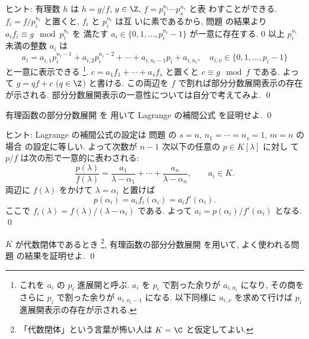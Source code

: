 \documentclass[12pt,twoside]{jarticle}
\begin{document}
\noindent
ヒント: 有理数 $h$ は $h=g/f$, $g\in\Z$, $f=p_1^{n_1}\cdots p_s^{n_s}$ と表
わすことができる.  $f_i=f/p_i^{n_i}$ と置くと, $f_i$ と $p_i^{n_i}$ は互
いに素であるから, 
問題  の結果より $a_if_i\equiv g \mod{p_i^{n_i}}$ を
満たす $a_i\in\{0,1,\dots,p_i^{n_i}-1\}$ が一意に存在する.
$0$ 以上 $p_i^{n_i}$ 未満の整数 $a_i$ は
\begin{equation*}
  a_i 
  = a_{i,1}p_i^{n_i-1} + a_{i,2}p_i^{n_i-2} 
  + \cdots + a_{i,n_i-1}p_i + a_{i,n_i},
  \quad
  a_{i,\nu}\in\{0,1,\dots,p_i-1\}
\end{equation*}
と一意に表示できる%
\footnote{これを $a_i$ の $p_i$ 進展開と呼ぶ. 
  $a_i$ を $p_i$ で割った余りが $a_{i,n_i}$ になり,
  その商をさらに $p_i$ で割った余りが $a_{i,n_i-1}$ になる.
  以下同様に $a_{i,\nu}$ を求めて行けば $p_i$ 進展開表示の存在が示される.}. 
$c=a_1f_1+\cdots+a_sf_s$ と置くと $c\equiv g \mod{f}$ である.
よって $g=qf+c$ ($q\in\Z$) と書ける.  
この両辺を $f$ で割れば部分分数展開表示の存在が示される.
部分分数展開表示の一意性については自分で考えてみよ.
\qed


\begin{question}
  有理函数の部分分数展開  を
  用いて Lagrange の補間公式  を証明せよ. 
  \qed
\end{question}

\noindent
ヒント: Lagrange の補間公式の設定は
問題  の $s=n$, $n_1=\cdots=n_s=1$, $m=n$ の場合
の設定に等しい.  よって次数が $n-1$ 次以下の任意の $p\in K[\lambda]$ に対し
て $p/f$ は次の形で一意的に表わされる:
\begin{equation*}
  \frac{p(\lambda)}{f(\lambda)}
  = \frac{a_1}{\lambda-\alpha_1}+\cdots+\frac{a_n}{\lambda-\alpha_n},
  \qquad
  a_i\in K.
\end{equation*}
両辺に $f(\lambda)$ をかけて $\lambda=\alpha_i$ と置けば
\begin{equation*}
  p(\alpha_i) = a_i f_i(\alpha_i) = a_i f'(\alpha_i).
\end{equation*}
ここで $f_i(\lambda)=f(\lambda)/(\lambda-\alpha_i)$ である. 
よって $a_i=p(\alpha_i)/f'(\alpha_i)$ となる.
\qed


\begin{question}
  $K$ が代数閉体であるとき%
  \footnote{「代数閉体」という言葉が怖い人は $K=\C$ と仮定してよい.},
  有理函数の部分分数展開  を用いて,
  よく使われる問題  の結果を証明せよ.
  \qed
\end{question}
\end{document}
